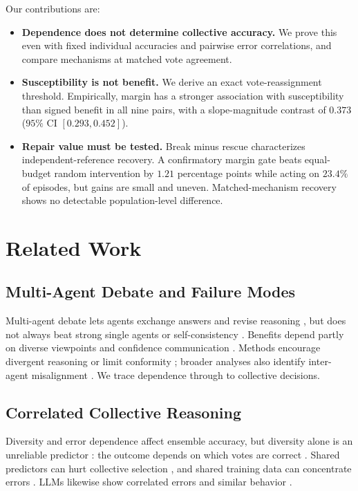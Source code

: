 \documentclass[11pt,a4paper]{article}
\theoremstyle{definition}
\begin{document}
Our contributions are:
\begin{itemize}
\item \textbf{Dependence does not determine collective accuracy.} We prove this even with fixed individual accuracies and pairwise error correlations, and compare mechanisms at matched vote agreement.
\item \textbf{Susceptibility is not benefit.} We derive an exact vote-reassignment threshold. Empirically, margin has a stronger association with susceptibility than signed benefit in all nine pairs, with a slope-magnitude contrast of $0.373$ ($95\%$ CI $[0.293,0.452]$).
\item \textbf{Repair value must be tested.} Break minus rescue characterizes independent-reference recovery. A confirmatory margin gate beats equal-budget random intervention by $1.21$ percentage points while acting on $23.4\%$ of episodes, but gains are small and uneven. Matched-mechanism recovery shows no detectable population-level difference.
\end{itemize}

\section{Related Work}
\label{sec:related-work}

\subsection{Multi-Agent Debate and Failure Modes}
\label{sec:rw-multi-agent}

Multi-agent debate lets agents exchange answers and revise reasoning \citep{du-etal-2024-multiagent}, but does not always beat strong single agents or self-consistency \citep{wang-etal-2024-rethinking-bounds,smit-etal-2024-mad}. Benefits depend partly on diverse viewpoints and confidence communication \citep{zhu-etal-2026-demystifying}. Methods encourage divergent reasoning \citep{liang-etal-2024-encouraging} or limit conformity \citep{cui-etal-2026-free}; broader analyses also identify inter-agent misalignment \citep{cemri-etal-2025-multi-agent}. We trace dependence through to collective decisions.

\subsection{Correlated Collective Reasoning}
\label{sec:rw-dependence}

Diversity and error dependence affect ensemble accuracy, but diversity alone is an unreliable predictor \citep{kuncheva-whitaker-2003-measures,wood-etal-2023-unified}: the outcome depends on which votes are correct \citep{brown-kuncheva-2010-good}. Shared predictors can hurt collective selection \citep{kleinberg-raghavan-2021-monoculture}, and shared training data can concentrate errors \citep{bommasani-etal-2022-picking}. LLMs likewise show correlated errors and similar behavior \citep{kim-etal-2025-correlated,goel-etal-2025-great}.
\end{document}
